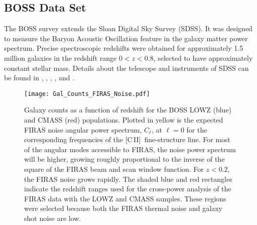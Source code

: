 \documentclass[fleqn,usenatbib]{mnras}
\newcommand{\cii}{[C{\sc\,II}]}
\begin{document}
\subsection{BOSS Data Set}
\label{sec:BOSS}
The BOSS survey \citep{dawson2012baryon} extends the Sloan Digital Sky Survey (SDSS). It was designed to measure the Baryon Acoustic Oscillation feature in the galaxy matter power spectrum. Precise spectroscopic redshifts were obtained for approximately 1.5\,million galaxies in the redshift range $0{<}z{<}0.8$, selected to have approximately constant stellar mass. 
Details about the telescope and instruments of SDSS can be found in \cite{1996AJ....111.1748F}, \cite{1998AJ....116.3040G}, \cite{gunn20062}, \cite{2010AJ....139.1628D}, and \cite{smee2013multi}.
\begin{figure}
  \texttt{[image: Gal\_Counts\_FIRAS\_Noise.pdf]}
  \caption{ \label{fig:Gal_counts_noise} Galaxy counts as a function of redshift for the BOSS LOWZ (blue) and CMASS (red) populations. Plotted in yellow is the expected FIRAS noise angular power spectrum, $C_{\ell}$, at $\ell=0$ for the corresponding frequencies of the \cii\ fine-structure line. For most of the angular modes accessible to FIRAS, the noise power spectrum will be higher, growing roughly proportional to the inverse of the square of the FIRAS beam and scan window function. For $z<0.2$, the FIRAS noise grows rapidly. The shaded blue and red rectangles indicate the redshift ranges used for the cross-power analysis of the FIRAS data with the LOWZ and CMASS samples. These regions were selected because both the FIRAS thermal noise and galaxy shot noise are low.}
\end{figure}
\end{document}
